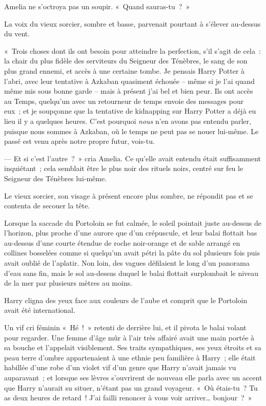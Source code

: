 Amelia ne s'octroya pas un soupir.
«~Quand sauras-tu~?~»

La voix du vieux sorcier, sombre et basse, parvenait pourtant à s'élever au-dessus du vent.

«~Trois choses dont ils ont besoin pour atteindre la perfection, s'il s'agit de cela~: la chair du plus fidèle des serviteurs du Seigneur des Ténèbres, le sang de son plus grand ennemi, et accès à une certaine tombe.
Je pensais Harry Potter à l'abri, avec leur tentative à Azkaban quasiment échouée -- même si je l'ai quand même mis sous bonne garde -- mais à présent j'ai bel et bien peur.
Ils ont accès au Temps, quelqu'un avec un retourneur de temps envoie des messages pour eux~; et je soupçonne que la tentative de kidnapping sur Harry Potter a déjà eu lieu il y a quelques heures.
C'est pourquoi \emph{nous} n'en avons pas entendu parler, puisque nous sommes à Azkaban, où le temps ne peut pas se nouer lui-même.
Le passé est venu après notre propre futur, vois-tu.

--- Et si c'est l'autre~?~»
cria Amelia.
Ce qu'elle avait entendu était suffisamment inquiétant~; cela semblait être le plus noir des rituels noirs, centré sur feu le Seigneur des Ténèbres lui-même.

Le vieux sorcier, son visage à présent encore plus sombre, ne répondit pas et se contenta de secouer la tête.

\later

Lorsque la saccade du Portoloin se fut calmée, le soleil pointait juste au-dessus de l'horizon, plus proche d'une aurore que d'un crépuscule, et leur balai flottait bas au-dessus d'une courte étendue de roche noir-orange et de sable arrangé en collines bosselées comme si quelqu'un avait pétri la pâte du sol plusieurs fois puis avait oublié de l'aplatir.
Non loin, des vagues défilaient le long d'un panorama d'eau sans fin, mais le sol au-dessus duquel le balai flottait surplombait le niveau de la mer par plusieurs mètres au moins.

Harry cligna des yeux face aux couleurs de l'aube et comprit que le Portoloin avait été international.

Un vif cri féminin «~Hé~!~»
retenti de derrière lui, et il pivota le balai volant pour regarder.
Une femme d'âge mûr à l'air très affairé avait une main portée à sa bouche et l'appelait visiblement.
Ses traits sympathiques, ses yeux étroits et sa peau terre d'ombre appartenaient à une ethnie peu familière à Harry~; elle était habillée d'une robe d'un violet vif d'un genre que Harry n'avait jamais vu auparavant~; et lorsque ses lèvres s'ouvrirent de nouveau elle parla avec un accent que Harry n'aurait su situer, n'étant pas un grand voyageur.
«~Où étais-tu~?
Tu as deux heures de retard~!
J'ai failli renoncer à vous voir arriver… bonjour~?~»


